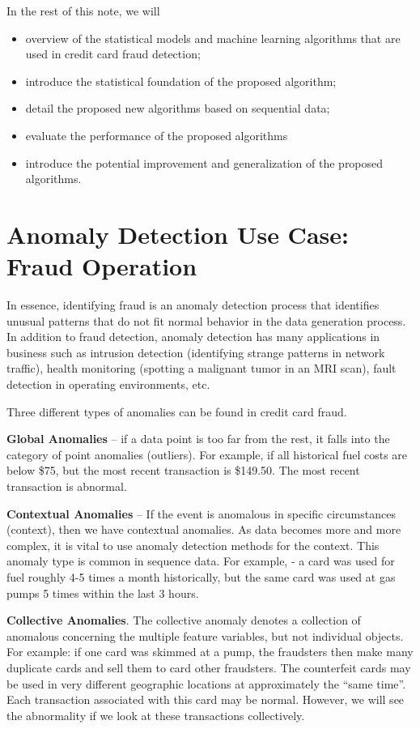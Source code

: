 \documentclass[
]{book}
\providecommand{\tightlist}{%
  \setlength{\itemsep}{0pt}\setlength{\parskip}{0pt}}
\begin{document}
In the rest of this note, we will

\begin{itemize}
\tightlist
\item
  overview of the statistical models and machine learning algorithms that are used in credit card fraud detection;
\item
  introduce the statistical foundation of the proposed algorithm;
\item
  detail the proposed new algorithms based on sequential data;
\item
  evaluate the performance of the proposed algorithms
\item
  introduce the potential improvement and generalization of the proposed algorithms.
\end{itemize}

\hypertarget{anomaly-detection-use-case-fraud-operation}{%
\section{Anomaly Detection Use Case: Fraud Operation}\label{anomaly-detection-use-case-fraud-operation}}

In essence, identifying fraud is an anomaly detection process that identifies unusual patterns that do not fit normal behavior in the data generation process. In addition to fraud detection, anomaly detection has many applications in business such as intrusion detection (identifying strange patterns in network traffic), health monitoring (spotting a malignant tumor in an MRI scan), fault detection in operating environments, etc.

Three different types of anomalies can be found in credit card fraud.

\textbf{Global Anomalies} -- if a data point is too far from the rest, it falls into the category of point anomalies (outliers). For example, if all historical fuel costs are below \$75, but the most recent transaction is \$149.50. The most recent transaction is abnormal.

\textbf{Contextual Anomalies} -- If the event is anomalous in specific circumstances (context), then we have contextual anomalies. As data becomes more and more complex, it is vital to use anomaly detection methods for the context. This anomaly type is common in sequence data. For example, - a card was used for fuel roughly 4-5 times a month historically, but the same card was used at gas pumps 5 times within the last 3 hours.

\textbf{Collective Anomalies}. The collective anomaly denotes a collection of anomalous concerning the multiple feature variables, but not individual objects. For example: if one card was skimmed at a pump, the fraudsters then make many duplicate cards and sell them to card other fraudsters. The counterfeit cards may be used in very different geographic locations at approximately the ``same time''. Each transaction associated with this card may be normal. However, we will see the abnormality if we look at these transactions collectively.
\end{document}
